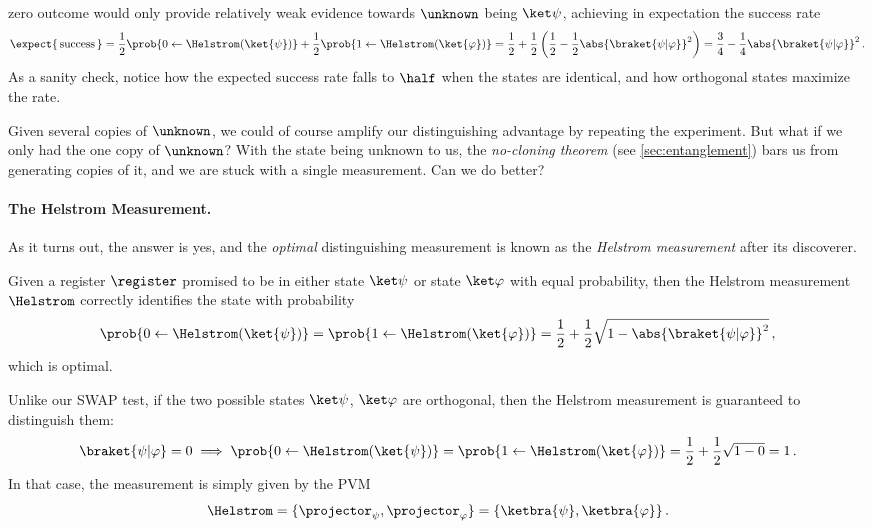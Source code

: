           zero outcome would only provide relatively weak evidence towards
          $\unknown$ being $\ket\psi$, achieving in expectation the success rate
        \[
          \expect{\, \text{success}\, } = \frac{1}{2} \prob{0 \gets \Helstrom(\ket{\psi})} 
            + \frac{1}{2} \prob{1 \gets \Helstrom(\ket{\varphi})}
            = \frac{1}{2} + \frac{1}{2}
            \left(
              \frac{1}{2} - \frac{1}{2} 
              \abs{
                \braket{\psi|\varphi}
              }^2
            \right) = \frac{3}{4} - \frac{1}{4} \abs{\braket{\psi|\varphi}}^2\, .
        \]
        As a sanity check, notice how the expected success rate
          falls to $\half$ when the states are identical, and how orthogonal
          states maximize the rate.

        Given several copies of $\unknown$, we
          could of course amplify our distinguishing advantage by repeating the
          experiment. But what if we only had the one copy of $\unknown$?
          With the state being unknown to us, the \emph{no-cloning theorem}
          (see \cref{sec:entanglement})
          bars us from generating copies of it, and we are stuck with a
          single measurement. Can we do better?

      \paragraph{The Helstrom Measurement.}
        As it turns out, the answer is yes, and the \emph{optimal} distinguishing
          measurement is known as the \emph{Helstrom measurement} after its
          discoverer.
        \begin{theorem}\label{thm:helstrom}
          Given a register $\register$ promised to be in either state
          $\ket\psi$ or state $\ket\varphi$ with equal probability, 
          then the Helstrom measurement $\Helstrom$ 
          correctly identifies the state with probability
          \[
            \prob{0 \gets \Helstrom(\ket{\psi})} 
            = 
            \prob{1 \gets \Helstrom(\ket{\varphi})} 
            = 
            \frac{1}{2} + \frac{1}{2} \sqrt{1 - \abs{\braket{\psi|\varphi}}^2}\, ,
          \]
          which is optimal. 
        \end{theorem}
        Unlike our SWAP test, if the two possible states $\ket\psi$, $\ket\varphi$
          are orthogonal, then the Helstrom measurement is
          guaranteed to distinguish them:
          \[
            \braket{\psi|\varphi} = 0 \implies
            \prob{0 \gets \Helstrom(\ket{\psi})} 
            = 
            \prob{1 \gets \Helstrom(\ket{\varphi})} 
            = 
            \frac{1}{2} + \frac{1}{2} \sqrt{1 - 0} = 1\, .
          \]
          In that case, the measurement is simply given by the PVM
          \[
            \Helstrom = \{ \projector_\psi, \projector_\varphi \}
            = \{ \ketbra{\psi}, \ketbra{\varphi} \}\, .
          \]
          
